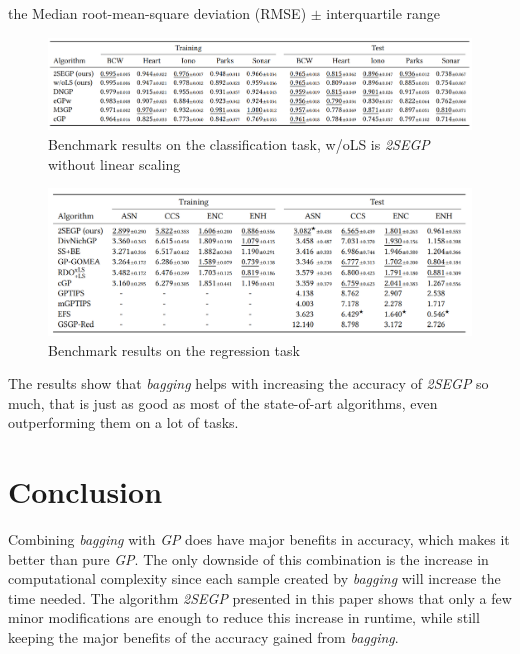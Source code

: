\documentclass[tikz, runningheads]{llncs}
\begin{document}
the Median root-mean-square deviation (RMSE) $\pm$ interquartile range
\begin{figure}[h]
	\centering
	\includegraphics[scale=0.27]{Images/Classification.PNG}
	\caption{Benchmark results on the classification task, w/oLS is \textit{2SEGP} without linear scaling} \label{ClassificationImage}
\end{figure}
\begin{figure}[h]
	\centering
	\includegraphics[scale=0.30]{Images/Regression.PNG}
	\caption{Benchmark results on the regression task} \label{RegressionImage}
\end{figure}
The results show that \textit{bagging} helps with increasing the accuracy of \textit{2SEGP} so much, that is just as good as most of the 
state-of-art algorithms, even outperforming them on a lot of tasks.

\section{Conclusion}
\label{sectionConclustion}
Combining \textit{bagging} with \textit{GP} does have major benefits in accuracy, which makes it better than pure \textit{GP}.
The only downside of this combination is the increase in computational complexity since each sample created by \textit{bagging}
will increase the time needed. The algorithm \textit{2SEGP} presented in this paper shows that only a few minor modifications 
are enough to reduce this increase in runtime, while still keeping the major benefits of the accuracy gained from \textit{bagging}. 

%
%
%


%
\end{document}
